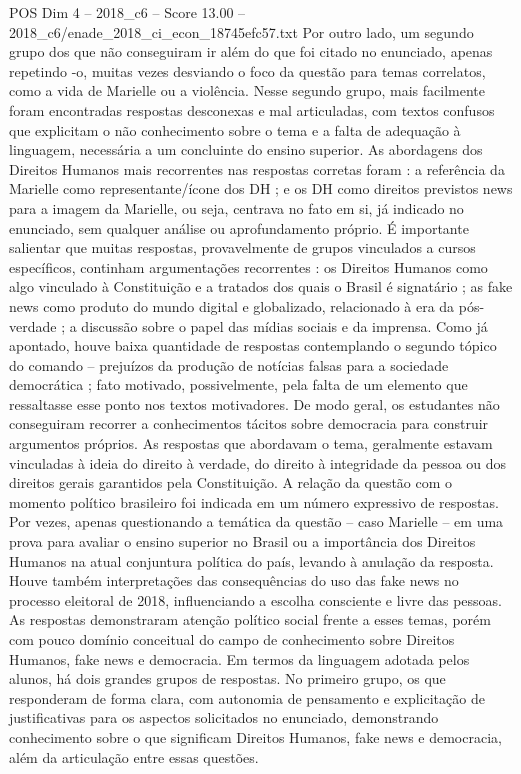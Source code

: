 \begin{textsample}{POS Dim 4 – 2018\_c6 – Score 13.00 – 2018\_c6/enade\_2018\_ci\_econ\_18745efc57.txt}
Por outro lado, um segundo grupo dos que não conseguiram ir além do que foi citado no enunciado, apenas repetindo -o, muitas vezes desviando o foco da questão para temas correlatos, como a vida de Marielle ou a violência.
Nesse segundo grupo, mais facilmente foram encontradas respostas desconexas e mal articuladas, com textos confusos que explicitam o não conhecimento sobre o tema e a falta de adequação à linguagem, necessária a um concluinte do ensino superior.
As abordagens dos Direitos Humanos mais recorrentes nas respostas corretas foram : a referência da Marielle como representante/ícone dos DH ; e os DH como direitos previstos news para a imagem da Marielle, ou seja, centrava no fato em si, já indicado no enunciado, sem qualquer análise ou aprofundamento próprio.
É importante salientar que muitas respostas, provavelmente de grupos vinculados a cursos específicos, continham argumentações recorrentes : os Direitos Humanos como algo vinculado à Constituição e a tratados dos quais o Brasil é signatário ; as fake news como produto do mundo digital e globalizado, relacionado à era da pós-verdade ; a discussão sobre o papel das mídias sociais e da imprensa.
Como já apontado, houve baixa quantidade de respostas contemplando o segundo tópico do comando – prejuízos da produção de notícias falsas para a sociedade democrática ; fato motivado, possivelmente, pela falta de um elemento que ressaltasse esse ponto nos textos motivadores.
De modo geral, os estudantes não conseguiram recorrer a conhecimentos tácitos sobre democracia para construir argumentos próprios.
As respostas que abordavam o tema, geralmente estavam vinculadas à ideia do direito à verdade, do direito à integridade da pessoa ou dos direitos gerais garantidos pela Constituição.
A relação da questão com o momento político brasileiro foi indicada em um número expressivo de respostas.
Por vezes, apenas questionando a temática da questão – caso Marielle – em uma prova para avaliar o ensino superior no Brasil ou a importância dos Direitos Humanos na atual conjuntura política do país, levando à anulação da resposta.
Houve também interpretações das consequências do uso das fake news no processo eleitoral de 2018, influenciando a escolha consciente e livre das pessoas.
As respostas demonstraram atenção político social frente a esses temas, porém com pouco domínio conceitual do campo de conhecimento sobre Direitos Humanos, fake news e democracia.
Em termos da linguagem adotada pelos alunos, há dois grandes grupos de respostas.
No primeiro grupo, os que responderam de forma clara, com autonomia de pensamento e explicitação de justificativas para os aspectos solicitados no enunciado, demonstrando conhecimento sobre o que significam Direitos Humanos, fake news e democracia, além da articulação entre essas questões.

\end{textsample}
